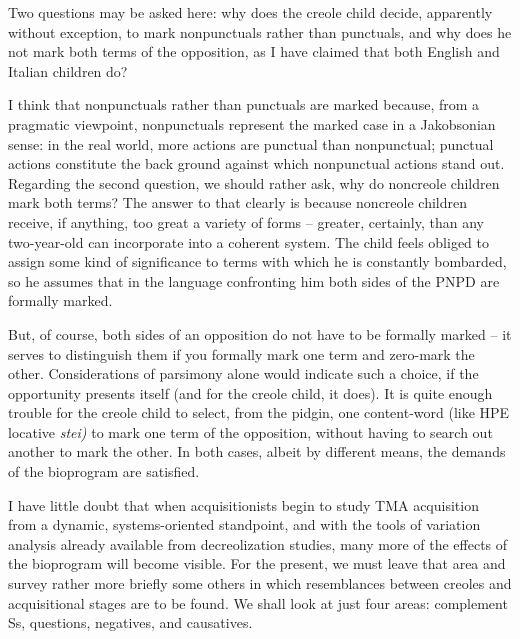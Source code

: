 Two questions may be asked here: why does the creole child decide, apparently without exception, to mark nonpunctuals rather than punctuals, and why does he not mark both terms of the opposition, as I have claimed that both English and Italian children do?

I think that nonpunctuals rather than punctuals are marked because, from a pragmatic viewpoint, nonpunctuals represent the marked case in a Jakobsonian sense: in the real world, more actions are punctual than nonpunctual; punctual actions constitute the back%
ground against which nonpunctual actions stand out. Regarding the second question, we should rather ask, why do noncreole children mark both terms? The answer to that clearly is because noncreole children receive, if anything, too great a variety of forms -- greater, certainly, than any two-year-old can incorporate into a coherent system. The child feels obliged to assign some kind of significance to terms with which he is constantly bombarded, so he assumes that in the language confronting him both sides of the PNPD are formally marked.

But, of course, both sides of an opposition do not have to be formally marked -- it serves to distinguish them if you formally mark one term and zero-mark the other. Considerations of parsimony alone would indicate such a choice, if the opportunity presents itself (and for the creole child, it does). It is quite enough trouble for the creole child to select, from the pidgin, one content-word (like HPE locative \textit{stei)} to mark one term of the opposition, without having to search out another to mark the other. In both cases, albeit by different means, the demands of the bioprogram are satisfied.

I have little doubt that when acquisitionists begin to study TMA acquisition from a dynamic, systems-oriented standpoint, and with the tools of variation analysis already available from decreolization studies, many more of the effects of the bioprogram will become visible. For the present, we must leave that area and survey rather more briefly some others in which resemblances between creoles and acquisitional stages are to be found. We shall look at just four areas: complement Ss, questions, negatives, and causatives.\\\\

